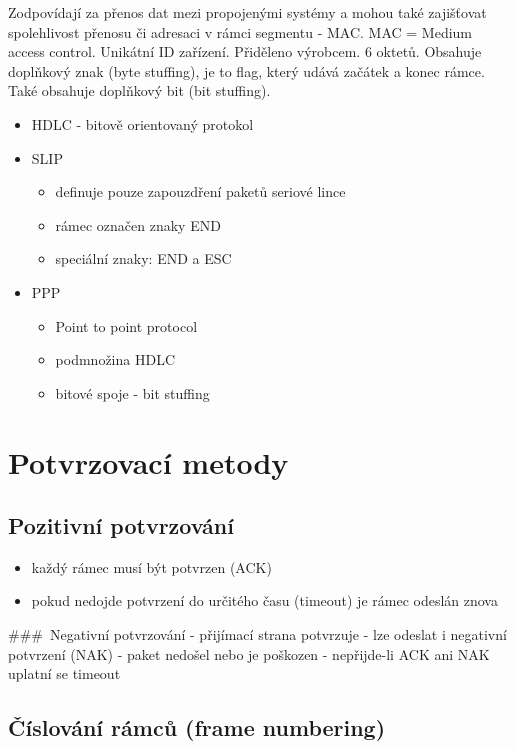 \documentclass{szzclass}
\providecommand{\tightlist}{%
  \setlength{\itemsep}{0pt}\setlength{\parskip}{0pt}}
\begin{document}
Zodpovídají za přenos dat mezi propojenými systémy a mohou také zajišťovat spolehlivost přenosu či adresaci v rámci segmentu - MAC.
MAC = Medium access control. Unikátní ID zařízení. Přiděleno výrobcem. 6 oktetů. Obsahuje doplňkový znak (byte stuffing), je to flag, který
udává začátek a konec rámce. Také obsahuje doplňkový bit (bit stuffing).
\begin{itemize}
  \item HDLC - bitově orientovaný protokol
  \item SLIP
  \begin{itemize}
    \item definuje pouze zapouzdření paketů seriové lince
    \item rámec označen znaky END
    \item speciální znaky: END a ESC
  \end{itemize}
  \item PPP
  \begin{itemize}
    \item Point to point protocol
    \item podmnožina HDLC
    \item bitové spoje - bit stuffing
  \end{itemize}
\end{itemize}

\hypertarget{potvrzovacuxed-metody}{%
\section{Potvrzovací metody}\label{potvrzovacuxed-metody}}

\hypertarget{pozitivnuxed-potvrzovuxe1nuxed}{%
\subsection{Pozitivní
potvrzování}\label{pozitivnuxed-potvrzovuxe1nuxed}}

\begin{itemize}
\tightlist
\item
  každý rámec musí být potvrzen (ACK)
\item
  pokud nedojde potvrzení do určitého času (timeout) je rámec odeslán
  znova
\end{itemize}

\#\#\#~Negativní potvrzování - přijímací strana potvrzuje - lze odeslat
i negativní potvrzení (NAK) - paket nedošel nebo je poškozen -
nepřijde-li ACK ani NAK uplatní se timeout

\hypertarget{ux10duxedslovuxe1nuxed-ruxe1mcux16f-frame-numbering}{%
\subsection{Číslování rámců (frame
numbering)}\label{ux10duxedslovuxe1nuxed-ruxe1mcux16f-frame-numbering}}
\end{document}
